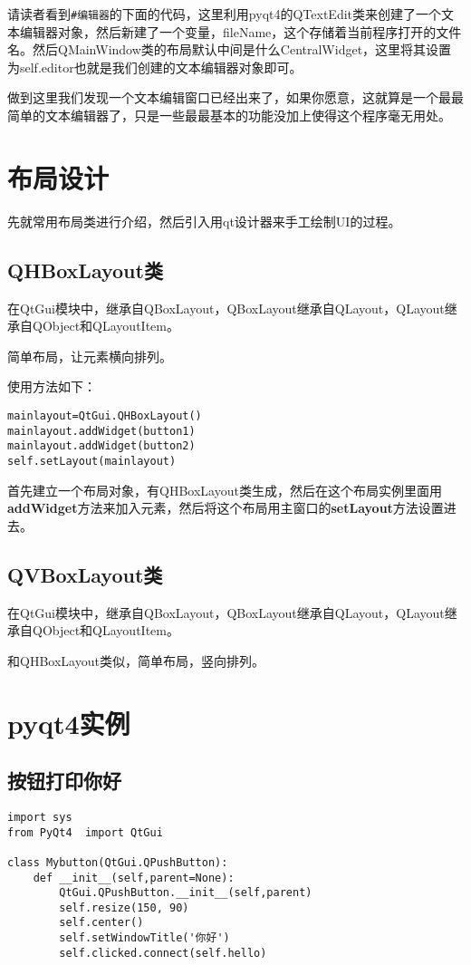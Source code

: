 \documentclass[12pt,oneside]{book}
\begin{document}
\begin{common-format}
请读者看到\verb+#编辑器+的下面的代码，这里利用pyqt4的QTextEdit类来创建了一个文本编辑器对象，然后新建了一个变量，fileName，这个存储着当前程序打开的文件名。然后QMainWindow类的布局默认中间是什么CentralWidget，这里将其设置为self.editor也就是我们创建的文本编辑器对象即可。

做到这里我们发现一个文本编辑窗口已经出来了，如果你愿意，这就算是一个最最简单的文本编辑器了，只是一些最最基本的功能没加上使得这个程序毫无用处。






\chapter{布局设计}
先就常用布局类进行介绍，然后引入用qt设计器来手工绘制UI的过程。

\section{QHBoxLayout类}
在QtGui模块中，继承自QBoxLayout，QBoxLayout继承自QLayout，QLayout继承自QObject和QLayoutItem。

简单布局，让元素横向排列。

使用方法如下：
\begin{Verbatim}
mainlayout=QtGui.QHBoxLayout()
mainlayout.addWidget(button1)
mainlayout.addWidget(button2)
self.setLayout(mainlayout)
\end{Verbatim}
首先建立一个布局对象，有QHBoxLayout类生成，然后在这个布局实例里面用\textbf{addWidget}方法来加入元素，然后将这个布局用主窗口的\textbf{setLayout}方法设置进去。

\section{QVBoxLayout类}
在QtGui模块中，继承自QBoxLayout，QBoxLayout继承自QLayout，QLayout继承自QObject和QLayoutItem。

和QHBoxLayout类似，简单布局，竖向排列。

\chapter{pyqt4实例}
\section{按钮打印你好}
\begin{Verbatim}
import sys
from PyQt4  import QtGui

class Mybutton(QtGui.QPushButton):
    def __init__(self,parent=None):
        QtGui.QPushButton.__init__(self,parent)
        self.resize(150, 90)
        self.center()
        self.setWindowTitle('你好')
        self.clicked.connect(self.hello)


\end{Verbatim}
\end{common-format}
\end{document}
